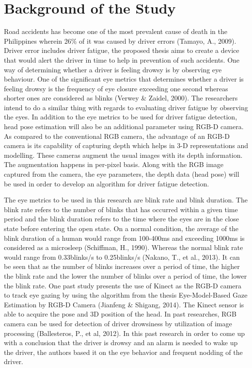 \section{Background of the Study}

Road accidents has become one of the most prevalent cause of death in the Philippines wherein 26\% of it was caused by driver errors (Tamayo, A., 2009). Driver error includes driver fatigue, the proposed thesis aims to create a device that would alert the driver in time to help in prevention of such accidents. One way of determining whether a driver is feeling drowsy is by observing eye behaviour. One of the significant eye metrics that determines whether a driver is feeling drowsy is the frequency of eye closure exceeding one second whereas shorter ones are considered as blinks (Verwey \& Zaidel, 2000). The researchers intend to do a similar thing with regards to evaluating driver fatigue by observing the eyes. In addition to the eye metrics to be used for driver fatigue detection, head pose estimation will also be an additional parameter using RGB-D camera. As compared to the conventional RGB camera, the advantage of an RGB-D camera is its capability of capturing depth which helps in 3-D representations and modelling. These cameras augment the usual images with its depth information. The augmentation happens in per-pixel basis. Along with the RGB image captured from the camera, the eye parameters, the depth data (head pose)  will be used in order to develop an algorithm for driver fatigue detection.

The eye metrics to be used in this research are blink rate and blink duration. The blink rate refers to the number of blinks that has occurred within a given time period and the blink duration refers to the time where the eyes are in the close state before entering the open state. On a normal condition, the average of the blink duration of a human would range from 100-400ms and exceeding 1000ms is considered as a microsleep (Schiffman, H., 1990). Whereas the normal blink rate would range from 0.33blinks/s to 0.25blinks/s (Nakano, T., et al., 2013). It can be seen that as the number of blinks increases over a period of time, the higher the blink rate and the lower the number of blinks over a period of time, the lower the blink rate.
One past study presents the use of Kinect as the RGB-D camera to track eye gazing by using the algorithm from the thesis Eye-Model-Based Gaze Estimation by RGB-D Camera (Jianfeng \& Shigang, 2014). The Kinect sensor is able to acquire the pose and 3D position of the head. In past researches, RGB camera can be used for detection of driver drowsiness by utilization of image processing (Ballesteros, P., et al, 2012). In this past research in order to come up with a conclusion that the driver is drowsy and an alarm is needed to wake up the driver, the authors based it on the eye behavior and frequent nodding of the driver.



